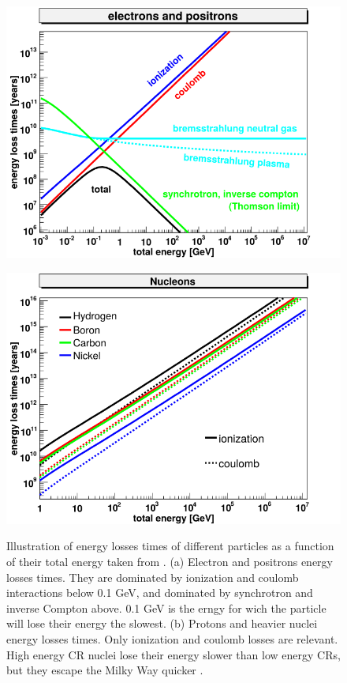 \begin{figure}[h]
  \centering
  \begin{minipage}[h]{0.45\textwidth}
  	\centering
	\includegraphics[width=1.\linewidth]{pic/theory/energy_losses_electrons-1.png}
  	\subcaption{}
  	\label{fig:E_losses_a}
  \end{minipage}
  \hfill
  \begin{minipage}[h]{0.45\textwidth}
	  \centering
	  \includegraphics[width=1.\linewidth]{pic/theory/energy_losses_nucleons.png}
	  \subcaption{}
	  \label{fig:E_losses_b}
  \end{minipage}
  \caption[Energy losses over time of CR particles.]{Illustration of energy losses times of different particles as a function of their total energy taken from \cite{Gebauer2010}. (a) Electron and positrons energy losses times. They are dominated by ionization and coulomb interactions below 0.1 GeV, and dominated by synchrotron and inverse Compton above. 0.1 GeV is the erngy for wich the particle will lose their energy the slowest. (b) Protons and heavier nuclei energy losses times. Only ionization and coulomb losses are relevant. High energy CR nuclei lose their energy slower than low energy CRs, but they escape the Milky Way quicker \cite{Semikov2015}.}
  \label{fig:E_losses} 
\end{figure}



